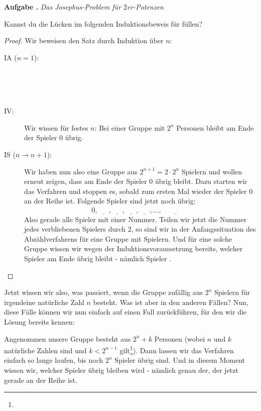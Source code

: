 \documentclass[a4paper,ngerman,12pt]{scrartcl}
\theoremstyle{definition}
\theoremstyle{plain}
\theoremstyle{remark}
\newlength{\aufgabenskip}
\newcounter{aufgabennummer}
\newenvironment{aufgabe}[1]{
	\refstepcounter{aufgabennummer}
	\textbf{Aufgabe \theaufgabennummer.} \emph{#1} \par
}{\vspace{\aufgabenskip}}
\begin{document}
\begin{aufgabe}{Das Josephus-Problem für $2$er-Potenzen}
	Kannst du die Lücken im folgenden Induktionsbeweis für  füllen?
\end{aufgabe}

\begin{proof}
	Wir beweisen den Satz durch Induktion über $n$:
	\begin{description}
		\item[IA ($n=1$):] \textcolor{white}{Bei einer Gruppengröße von $2^1=2$ Personen ist lediglich ein einziger Spielzug notwendig: Spieler $0$ beginnt, indem er Spieler $1$ antippt. Dieser scheidet aus, wodurch Spieler $0$ als letzter Spieler übrig bleibt.}
		\item[IV:] Wir wissen für festes $n$: Bei einer Gruppe mit $2^n$ Personen bleibt am Ende der Spieler $0$ übrig.
		\item[IS ($n\to n+1$):] Wir haben nun also eine Gruppe aus $2^{n+1} = 2\cdot 2^n$ Spielern und wollen erneut zeigen, dass am Ende der Spieler $0$ übrig bleibt. Dazu starten wir das Verfahren und stoppen es, sobald zum ersten Mal wieder der Spieler $0$ an der Reihe ist. Folgende Spieler sind jetzt noch übrig:
			\[0, \underline{\phantom{2\quad}}, \underline{\phantom{4\quad}}, \underline{\phantom{6\quad}}, \underline{\phantom{8\quad}}, \dots , \underline{\phantom{ 2^{n+1}-2 }}\]
		Also gerade alle Spieler mit einer \underline{\phantom{ geraden\quad }} Nummer. Teilen wir jetzt die Nummer jedes verbliebenen Spielers durch $2$, so sind wir in der Anfangssituation des Abzählverfahrens für eine Gruppe mit \underline{\phantom{$2^n$\quad}} Spielern. Und für eine solche Gruppe wissen wir wegen der Induktionsvoraussetzung bereits, welcher Spieler am Ende übrig bleibt - nämlich Spieler \underline{\phantom{$0$\quad}}. \qedhere
	\end{description}
\end{proof}

Jetzt wissen wir also, was passiert, wenn die Gruppe zufällig aus $2^n$ Spielern für irgendeine natürliche Zahl $n$ besteht. Was ist aber in den anderen Fällen? Nun, diese Fälle können wir nun einfach auf einen Fall zurückführen, für den wir die Lösung bereits kennen:

Angenommen unsere Gruppe besteht aus $2^n + k$ Personen (wobei $n$ und $k$ natürliche Zahlen sind und $k < 2^{n-1}$ gilt\footnote{}). Dann lassen wir das Verfahren einfach so lange laufen, bis noch $2^n$ Spieler übrig sind. Und in diesem Moment wissen wir, welcher Spieler übrig bleiben wird - nämlich genau der, der jetzt gerade an der Reihe ist.
\end{document}
